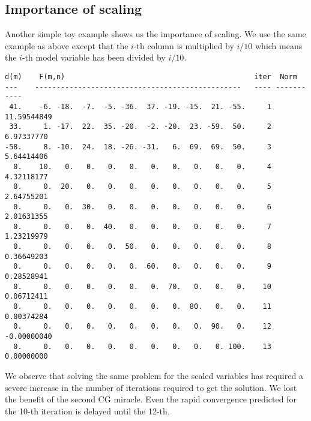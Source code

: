 \subsection{Importance of scaling}

Another simple toy example shows us the importance of scaling.
We use the same example as above
except that the $i$-th column is multiplied by $i/10$
which means the $i$-th model variable has been divided by $i/10$.

\par\noindent
\footnotesize
\begin{verbatim}
d(m)    F(m,n)                                            iter  Norm
---    ------------------------------------------------   ---- -----------
 41.    -6. -18.  -7.  -5. -36.  37. -19. -15.  21. -55.     1 11.59544849
 33.     1. -17.  22.  35. -20.  -2. -20.  23. -59.  50.     2  6.97337770
-58.     8. -10.  24.  18. -26. -31.   6.  69.  69.  50.     3  5.64414406
  0.    10.   0.   0.   0.   0.   0.   0.   0.   0.   0.     4  4.32118177
  0.     0.  20.   0.   0.   0.   0.   0.   0.   0.   0.     5  2.64755201
  0.     0.   0.  30.   0.   0.   0.   0.   0.   0.   0.     6  2.01631355
  0.     0.   0.   0.  40.   0.   0.   0.   0.   0.   0.     7  1.23219979
  0.     0.   0.   0.   0.  50.   0.   0.   0.   0.   0.     8  0.36649203
  0.     0.   0.   0.   0.   0.  60.   0.   0.   0.   0.     9  0.28528941
  0.     0.   0.   0.   0.   0.   0.  70.   0.   0.   0.    10  0.06712411
  0.     0.   0.   0.   0.   0.   0.   0.  80.   0.   0.    11  0.00374284
  0.     0.   0.   0.   0.   0.   0.   0.   0.  90.   0.    12 -0.00000040
  0.     0.   0.   0.   0.   0.   0.   0.   0.   0. 100.    13  0.00000000
\end{verbatim}
\normalsize
We observe that solving the same problem for the scaled variables
has required a severe increase
in the number of iterations required to get the solution.
We lost the benefit of the second CG miracle.
Even the rapid convergence predicted for the 10-th iteration
is delayed until the 12-th.

